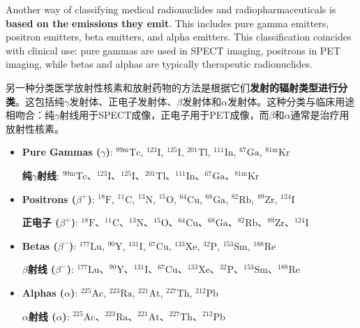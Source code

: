 \documentclass[dvipsnames, svgnames,a4paper,11pt]{article}
\begin{document}
Another way of classifying medical radionuclides and radiopharmaceuticals is \textbf{based on the emissions they emit}. This includes pure gamma emitters, positron emitters, beta emitters, and alpha emitters. This classification coincides with clinical use: pure gammas are used in SPECT imaging, positrons in PET imaging, while betas and alphas are typically therapeutic radionuclides.

另一种分类医学放射性核素和放射药物的方法是根据它们\textbf{发射的辐射类型进行分类}。这包括纯$\gamma$发射体、正电子发射体、$\beta$发射体和$\alpha$发射体。这种分类与临床用途相吻合：纯$\gamma$射线用于SPECT成像，正电子用于PET成像，而$\beta$和$\alpha$通常是治疗用放射性核素。

\begin{itemize}

      \item \textbf{Pure Gammas ($\gamma$)}: ${}^\text{99m}\text{Tc}$, ${}^\text{123}\text{I}$, ${}^\text{125}\text{I}$, ${}^\text{201}\text{Tl}$, ${}^\text{111}\text{In}$, ${}^\text{67}\text{Ga}$, ${}^\text{81m}\text{Kr}$

            \textbf{纯$\gamma$射线}: ${}^\text{99m}\text{Tc}$、${}^\text{123}\text{I}$、${}^\text{125}\text{I}$、${}^\text{201}\text{Tl}$、${}^\text{111}\text{In}$、${}^\text{67}\text{Ga}$、${}^\text{81m}\text{Kr}$

      \item \textbf{Positrons ($\beta^+$)}: ${}^\text{18}\text{F}$, ${}^\text{11}\text{C}$, ${}^\text{13}\text{N}$, ${}^\text{15}\text{O}$, ${}^\text{64}\text{Cu}$, ${}^\text{68}\text{Ga}$, ${}^\text{82}\text{Rb}$, ${}^\text{89}\text{Zr}$, ${}^\text{124}\text{I}$

            \textbf{正电子 ($\beta^+$)}: ${}^\text{18}\text{F}$、${}^\text{11}\text{C}$、${}^\text{13}\text{N}$、${}^\text{15}\text{O}$、${}^\text{64}\text{Cu}$、${}^\text{68}\text{Ga}$、${}^\text{82}\text{Rb}$、${}^\text{89}\text{Zr}$、${}^\text{124}\text{I}$

      \item \textbf{Betas ($\beta^-$)}: ${}^\text{177}\text{Lu}$, ${}^\text{90}\text{Y}$, ${}^\text{131}\text{I}$, ${}^\text{67}\text{Cu}$, ${}^\text{133}\text{Xe}$, ${}^\text{32}\text{P}$, ${}^\text{153}\text{Sm}$, ${}^\text{188}\text{Re}$

            \textbf{$\beta$射线 ($\beta^-$)}: ${}^\text{177}\text{Lu}$、${}^\text{90}\text{Y}$、${}^\text{131}\text{I}$、${}^\text{67}\text{Cu}$、${}^\text{133}\text{Xe}$、${}^\text{32}\text{P}$、${}^\text{153}\text{Sm}$、${}^\text{188}\text{Re}$

      \item \textbf{Alphas ($\alpha$)}: ${}^\text{225}\text{Ac}$, ${}^\text{223}\text{Ra}$, ${}^\text{221}\text{At}$, ${}^\text{227}\text{Th}$, ${}^\text{212}\text{Pb}$

            \textbf{$\alpha$射线 ($\alpha$)}: ${}^\text{225}\text{Ac}$、${}^\text{223}\text{Ra}$、${}^\text{221}\text{At}$、${}^\text{227}\text{Th}$、${}^\text{212}\text{Pb}$

\end{itemize}
\end{document}
